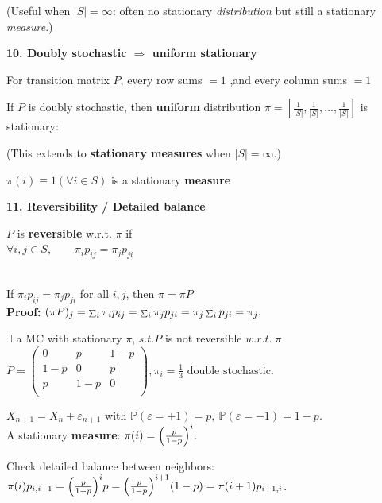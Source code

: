 \documentclass[a4paper, landscape]{article}
\newcommand{\topic}[1]{\par\medskip\textbf{#1}\par}
\newcommand{\subtopic}[1]{\par\textbf{#1}}
\newcommand{\smallsum}{\mathop{\scalebox{0.65}{$\sum$}}\nolimits}
\renewcommand{\topic}[1]{\par\medskip\noindent\colorbox{highlightcolor}{\parbox{\dimexpr\columnwidth-2\fboxsep\relax}{\textbf{#1}}}\par}
\renewcommand{\subtopic}[1]{\par\textbf{\color{blue}{#1}}} %
\begin{document}
\begin{multicols}{4}
(Useful when $|S|=\infty$: often no stationary \emph{distribution} but still a stationary \emph{measure}.)

\topic{10. Doubly stochastic $\Rightarrow$ uniform stationary}
\subtopic{Doubly stochastic:}
For transition matrix $P$, every row sums $=1$  ,and every column sums $=1$


\subtopic{Fact (finite $|S|$):}
If $P$ is doubly stochastic, then \textbf{uniform} distribution $\pi =[\frac{1}{|S|},\frac{1}{|S|},...,\frac{1}{|S|}]$ is stationary:

\par (This extends to \textbf{stationary measures} when $|S|=\infty$.)

\subtopic{e.g.SRW on 1D:} $\pi(i)\equiv 1 (\forall i\in S)$ is a stationary \textbf{measure}


\topic{11. Reversibility / Detailed balance}
\subtopic{Reversibility:} 
$P$ is \textbf{reversible} w.r.t. $\pi$ if\\
$\forall i,j\in S,\qquad \pi_i p_{ij}=\pi_j p_{ji}$


\subtopic{Fact: reversible $\Rightarrow$ stationary:}\\
If $\pi_i p_{ij}=\pi_j p_{ji}$ for all $i,j$, then $\pi=\pi P$ \\
\textbf{Proof:} $(\pi P)_j=\smallsum_i \pi_i p_{ij}=\smallsum_i \pi_j p_{ji}=\pi_j\smallsum_i p_{ji}=\pi_j.$

\subtopic{Notice: stationary$\not\Rightarrow$ reversibility:}$\exists$ a MC with stationary $\pi$, $s.t. P$ is not reversible $w.r.t. \;\pi$\\
$P=
\begin{pmatrix}
0 & p & 1-p\\
1-p & 0 & p\\
p & 1-p & 0\\
\end{pmatrix}
,\pi_i=\frac1 3 \text{ double stochastic.}
$

\subtopic{Example: biased random walk on $\mathbb Z$:}
$X_{n+1}=X_n+\varepsilon_{n+1}$ with $\mathbb P(\varepsilon=+1)=p,\ \mathbb P(\varepsilon=-1)=1-p$.\\
A stationary \textbf{measure}: $\pi(i)=\Bigl(\frac{p}{1-p}\Bigr)^i.$

Check detailed balance between neighbors: $\pi(i)p_{i,i+1}=\Bigl(\frac{p}{1-p}\Bigr)^i p=\Bigl(\frac{p}{1-p}\Bigr)^{i+1}(1-p)=\pi(i+1)p_{i+1,i}$.


\end{multicols}
\end{document}

